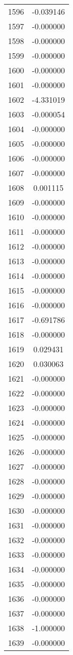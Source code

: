 \documentclass[12pt]{article}
\begin{document}
\begin{longtable}{@{}cc@{}}
1596 & -0.039146 \\
1597 & -0.000000 \\
1598 & -0.000000 \\
1599 & -0.000000 \\
1600 & -0.000000 \\
1601 & -0.000000 \\
1602 & -4.331019 \\
1603 & -0.000054 \\
1604 & -0.000000 \\
1605 & -0.000000 \\
1606 & -0.000000 \\
1607 & -0.000000 \\
1608 & 0.001115 \\
1609 & -0.000000 \\
1610 & -0.000000 \\
1611 & -0.000000 \\
1612 & -0.000000 \\
1613 & -0.000000 \\
1614 & -0.000000 \\
1615 & -0.000000 \\
1616 & -0.000000 \\
1617 & -0.691786 \\
1618 & -0.000000 \\
1619 & 0.029431 \\
1620 & 0.030063 \\
1621 & -0.000000 \\
1622 & -0.000000 \\
1623 & -0.000000 \\
1624 & -0.000000 \\
1625 & -0.000000 \\
1626 & -0.000000 \\
1627 & -0.000000 \\
1628 & -0.000000 \\
1629 & -0.000000 \\
1630 & -0.000000 \\
1631 & -0.000000 \\
1632 & -0.000000 \\
1633 & -0.000000 \\
1634 & -0.000000 \\
1635 & -0.000000 \\
1636 & -0.000000 \\
1637 & -0.000000 \\
1638 & -1.000000 \\
1639 & -0.000000 \\

\end{longtable}
\end{document}
